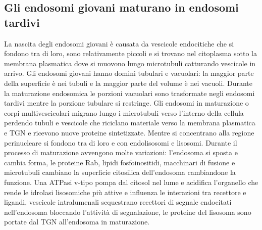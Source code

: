\subsection{Gli endosomi giovani maturano in endosomi tardivi}
La nascita degli endosomi giovani \`e causata da vescicole endocitiche che si fondono tra di loro, sono relativamente piccoli e si trovano nel citoplasma sotto la membrana plasmatica
dove si muovono lungo microtubuli catturando vescicole in arrivo. Gli endosomi giovani hanno domini tubulari e vacuolari: la maggior parte della superficie \`e nei tubuli e la maggior 
parte del volume \`e nei vacuoli. Durante la maturazione endosomica le porzioni vacuolari sono trasformate negli endosomi tardivi mentre la porzione tubulare si restringe. Gli endosomi 
in maturazione o corpi multivescicolari migrano lungo i microtubuli verso l'interno della cellula perdendo tubuli e vescicole che riciclano materiale verso la membrana plasmatica e TGN
e ricevono nuove proteine sintetizzate. Mentre si concentrano alla regione perinucleare si fondono tra di loro e con endolisosomi e lisosomi. Durante il processo di maturazione avvengono
molte variazioni: l'endosoma si sposta e cambia forma, le proteine Rab, lipidi fosfoinositidi, macchinari di fusione e microtubuli cambiano la superficie citosilica dell'endosoma 
cambiandone la funzione. Una ATPasi v-tipo pompa  dal citosol nel lume e acidifica l'organello che rende le idrolasi lisosomiche pi\`u attive e influenza le interazioni 
tra recettore e ligandi, vescicole intralumenali sequestrano recettori di segnale endocitati nell'endosoma bloccando l'attivit\`a di segnalazione, le proteine del lisosoma sono
portate dal TGN all'endosoma in maturazione. 
